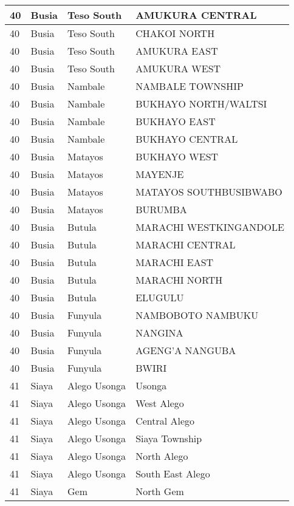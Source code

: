 \begin{table}[!ht]
\begin{tabular}{|l|l|l|l|}
        40 & Busia & Teso South & AMUKURA CENTRAL \\ \hline
        40 & Busia & Teso South & CHAKOI NORTH \\ \hline
        40 & Busia & Teso South & AMUKURA EAST \\ \hline
        40 & Busia & Teso South & AMUKURA WEST \\ \hline
        40 & Busia & Nambale & NAMBALE TOWNSHIP \\ \hline
        40 & Busia & Nambale & BUKHAYO NORTH/WALTSI \\ \hline
        40 & Busia & Nambale & BUKHAYO EAST \\ \hline
        40 & Busia & Nambale & BUKHAYO CENTRAL \\ \hline
        40 & Busia & Matayos & BUKHAYO WEST \\ \hline
        40 & Busia & Matayos & MAYENJE \\ \hline
        40 & Busia & Matayos & MATAYOS SOUTHBUSIBWABO \\ \hline
        40 & Busia & Matayos & BURUMBA \\ \hline
        40 & Busia & Butula & MARACHI WESTKINGANDOLE \\ \hline
        40 & Busia & Butula & MARACHI CENTRAL \\ \hline
        40 & Busia & Butula & MARACHI EAST \\ \hline
        40 & Busia & Butula & MARACHI NORTH \\ \hline
        40 & Busia & Butula & ELUGULU \\ \hline
        40 & Busia & Funyula & NAMBOBOTO NAMBUKU \\ \hline
        40 & Busia & Funyula & NANGINA \\ \hline
        40 & Busia & Funyula & AGENG’A NANGUBA \\ \hline
        40 & Busia & Funyula & BWIRI \\ \hline
        41 & Siaya & Alego Usonga & Usonga \\ \hline
        41 & Siaya & Alego Usonga & West Alego \\ \hline
        41 & Siaya & Alego Usonga & Central Alego \\ \hline
        41 & Siaya & Alego Usonga & Siaya Township \\ \hline
        41 & Siaya & Alego Usonga & North Alego \\ \hline
        41 & Siaya & Alego Usonga & South East Alego \\ \hline
        41 & Siaya & Gem & North Gem \\ \hline

\end{tabular}
\end{table}
